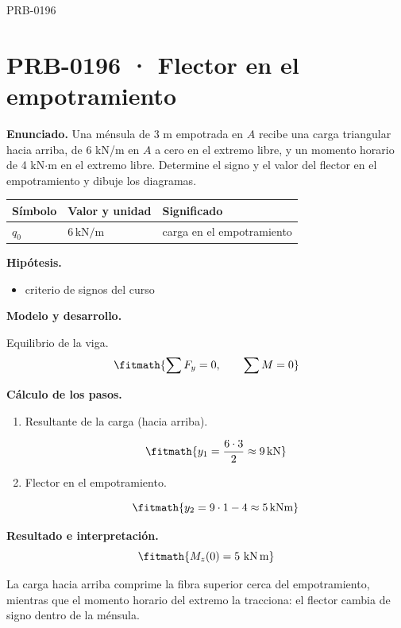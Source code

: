 \begin{studiumworked}{PRB-0196}

\section{PRB-0196 · Flector en el empotramiento}

\textbf{Enunciado.} Una ménsula de 3 m empotrada en $A$ recibe una carga triangular hacia arriba, de 6 kN/m en $A$ a cero en el extremo libre, y un momento horario de 4 kN$\cdot$m en el extremo libre. Determine el signo y el valor del flector en el empotramiento y dibuje los diagramas.

\par\medskip\noindent\begin{tabular}{@{}p{.18\linewidth}p{.26\linewidth}p{.48\linewidth}@{}}
\toprule Símbolo & Valor y unidad & Significado\\\midrule
$q_{0}$ & $6\,\mathrm{kN/m}$ & carga en el empotramiento\\
\bottomrule\end{tabular}\par\medskip

\textbf{Hipótesis.}\begin{itemize}\item criterio de signos del curso\end{itemize}

\textbf{Modelo y desarrollo.}

Equilibrio de la viga.\[\fitmath{\sum F_y = 0,\qquad \sum M = 0}\]

\textbf{Cálculo de los pasos.}

\begin{enumerate}

\item Resultante de la carga (hacia arriba).

\[\fitmath{y_{1}=\frac{6\cdot 3}{2}\approx 9\,\mathrm{kN}}\]

\item Flector en el empotramiento.

\[\fitmath{y_{2}=9\cdot 1-4\approx 5\,\mathrm{kN m}}\]

\end{enumerate}

\textbf{Resultado e interpretación.}\[\fitmath{M_z(0) = 5\ \mathrm{kN\,m}}\]

La carga hacia arriba comprime la fibra superior cerca del empotramiento, mientras que el momento horario del extremo la tracciona: el flector cambia de signo dentro de la ménsula.


\end{studiumworked}
